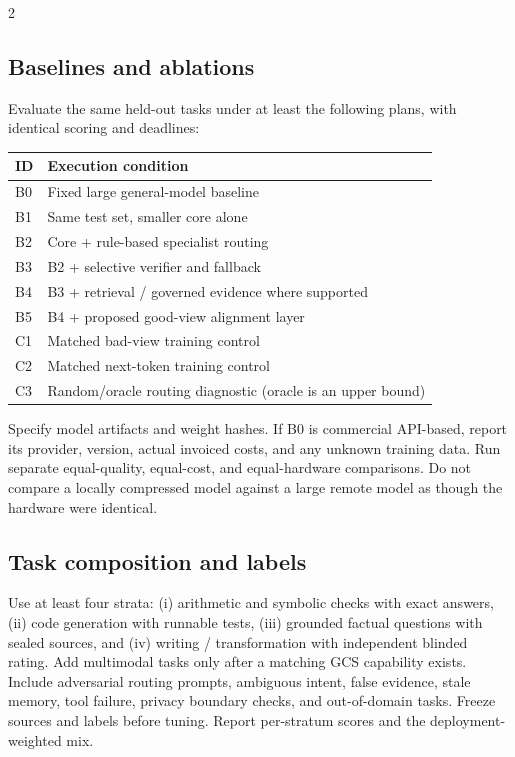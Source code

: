 \documentclass[10pt,letterpaper]{article}
\begin{document}
\begin{multicols}{2}
\subsection{Baselines and ablations}
Evaluate the same held-out tasks under at least the following plans, with identical scoring and deadlines:
\begin{center}\footnotesize
\begin{tabular}{@{}p{0.35in}p{2.66in}@{}}
\toprule
ID & Execution condition \\
\midrule
B0 & Fixed large general-model baseline \\
B1 & Same test set, smaller core alone \\
B2 & Core + rule-based specialist routing \\
B3 & B2 + selective verifier and fallback \\
B4 & B3 + retrieval / governed evidence where supported \\
B5 & B4 + proposed good-view alignment layer \\
C1 & Matched bad-view training control \\
C2 & Matched next-token training control \\
C3 & Random/oracle routing diagnostic (oracle is an upper bound) \\
\bottomrule
\end{tabular}
\end{center}

Specify model artifacts and weight hashes. If B0 is commercial API-based, report its provider, version, actual invoiced costs, and any unknown training data. Run separate equal-quality, equal-cost, and equal-hardware comparisons. Do not compare a locally compressed model against a large remote model as though the hardware were identical.

\subsection{Task composition and labels}
Use at least four strata: (i) arithmetic and symbolic checks with exact answers, (ii) code generation with runnable tests, (iii) grounded factual questions with sealed sources, and (iv) writing / transformation with independent blinded rating. Add multimodal tasks only after a matching GCS capability exists. Include adversarial routing prompts, ambiguous intent, false evidence, stale memory, tool failure, privacy boundary checks, and out-of-domain tasks. Freeze sources and labels before tuning. Report per-stratum scores and the deployment-weighted mix.


\end{multicols}
\end{document}
